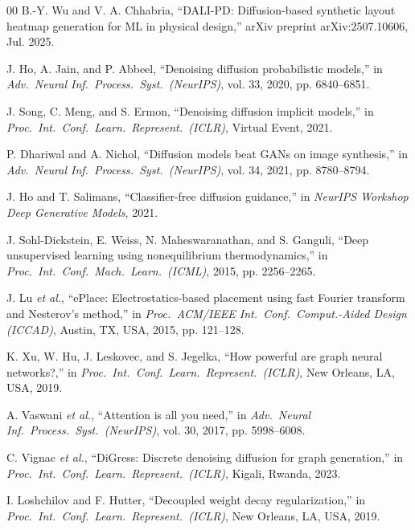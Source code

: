 \documentclass{ieeeaccess}
\begin{document}
\begin{thebibliography}{00}
 B.-Y. Wu and V. A. Chhabria, ``DALI-PD: Diffusion-based synthetic layout heatmap generation for ML in physical design,'' arXiv preprint arXiv:2507.10606, Jul. 2025.

 J. Ho, A. Jain, and P. Abbeel, ``Denoising diffusion probabilistic models,'' in \emph{Adv.\ Neural Inf.\ Process.\ Syst.\ (NeurIPS)}, vol. 33, 2020, pp. 6840--6851.

 J. Song, C. Meng, and S. Ermon, ``Denoising diffusion implicit models,'' in \emph{Proc.\ Int.\ Conf.\ Learn.\ Represent.\ (ICLR)}, Virtual Event, 2021.

 P. Dhariwal and A. Nichol, ``Diffusion models beat GANs on image synthesis,'' in \emph{Adv.\ Neural Inf.\ Process.\ Syst.\ (NeurIPS)}, vol. 34, 2021, pp. 8780--8794.

 J. Ho and T. Salimans, ``Classifier-free diffusion guidance,'' in \emph{NeurIPS Workshop Deep Generative Models}, 2021.

 J. Sohl-Dickstein, E. Weiss, N. Maheswaranathan, and S. Ganguli, ``Deep unsupervised learning using nonequilibrium thermodynamics,'' in \emph{Proc.\ Int.\ Conf.\ Mach.\ Learn.\ (ICML)}, 2015, pp. 2256--2265.

 J. Lu \emph{et al.}, ``ePlace: Electrostatics-based placement using fast Fourier transform and Nesterov's method,'' in \emph{Proc.\ ACM/IEEE Int.\ Conf.\ Comput.-Aided Design (ICCAD)}, Austin, TX, USA, 2015, pp. 121--128.

 K. Xu, W. Hu, J. Leskovec, and S. Jegelka, ``How powerful are graph neural networks?,'' in \emph{Proc.\ Int.\ Conf.\ Learn.\ Represent.\ (ICLR)}, New Orleans, LA, USA, 2019.

 A. Vaswani \emph{et al.}, ``Attention is all you need,'' in \emph{Adv.\ Neural Inf.\ Process.\ Syst.\ (NeurIPS)}, vol. 30, 2017, pp. 5998--6008.

 C. Vignac \emph{et al.}, ``DiGress: Discrete denoising diffusion for graph generation,'' in \emph{Proc.\ Int.\ Conf.\ Learn.\ Represent.\ (ICLR)}, Kigali, Rwanda, 2023.

 I. Loshchilov and F. Hutter, ``Decoupled weight decay regularization,'' in \emph{Proc.\ Int.\ Conf.\ Learn.\ Represent.\ (ICLR)}, New Orleans, LA, USA, 2019.

\end{thebibliography}

\EOD
\end{document}
